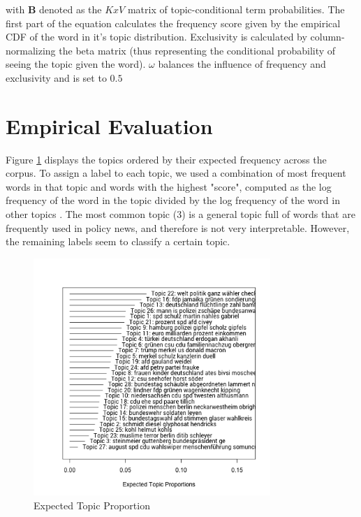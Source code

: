 \documentclass[12pt,a4paper,notitlepage]{article}
\begin{document}
with $\boldsymbol{B}$ denoted as the $KxV$ matrix of topic-conditional term probabilities. The first part of the equation calculates the frequency score  given by the empirical CDF of the word in it's topic distribution. Exclusivity is calculated by column-normalizing the beta matrix (thus representing the conditional probability of seeing the topic given the word). $\omega$ balances the influence of frequency and exclusivity and is set to $0.5$

\section{Empirical Evaluation}

Figure \ref{fig_topic_proportion} displays the topics ordered by their expected frequency across the corpus. To assign a label to each topic, we used a combination of most frequent words in that topic and words with the highest "score", computed as the log frequency of the word in the topic divided by the log frequency of the word in other topics \citep{roberts_stm:_2016}. The most common topic (3) is a general topic full of words that are frequently used in policy news, and therefore is not very interpretable. However, the remaining labels seem to classify a certain topic.  

\begin{figure}[H]
	\begin{center}
	\includegraphics[width=0.8\textwidth,keepaspectratio]{../figs/topic_proportion.png}
	\caption{Expected Topic Proportion}
	\label{fig_topic_proportion}
	\end{center}
\end{figure}
\end{document}
